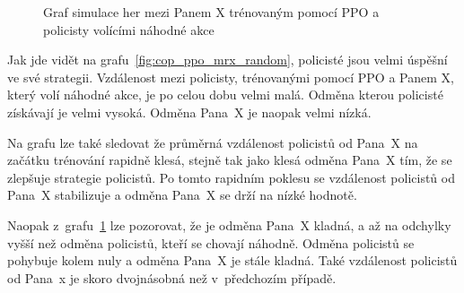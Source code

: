 \begin{figure}[H]
\begin{minipage}{.48\textwidth}
      \caption{Graf simulace her mezi Panem X trénovaným pomocí PPO a policisty volícími náhodné akce}
      \label{fig:cop_random_mrx_ppo}
  \end{minipage}
  \end{figure}

Jak jde vidět na grafu~\ref{fig:cop_ppo_mrx_random}, policisté jsou velmi úspěšní ve své strategii.
Vzdálenost mezi policisty, trénovanými pomocí PPO a Panem X, který volí náhodné akce, je po celou dobu velmi malá.
Odměna kterou policisté získávají je velmi vysoká.
Odměna Pana~X je naopak velmi nízká.

Na grafu lze také sledovat že průměrná vzdálenost policistů od Pana~X na začátku trénování rapidně klesá, stejně tak jako klesá odměna Pana~X tím, že se zlepšuje strategie policistů.
Po tomto rapidním poklesu se vzdálenost policistů od Pana~X stabilizuje a odměna Pana~X se drží na nízké hodnotě.

Naopak z~grafu~\ref{fig:cop_random_mrx_ppo} lze pozorovat, že je odměna Pana~X kladná, a až na odchylky vyšší než odměna policistů, kteří se chovají náhodně.
Odměna policistů se pohybuje kolem nuly a odměna Pana~X je stále kladná.
Také vzdálenost policistů od Pana~x je skoro dvojnásobná než v~předchozím případě.

